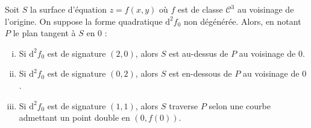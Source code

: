 
	\begin{application}
		Soit $S$ la surface d'équation $z = f(x, y)$ où $f$ est de classe $\mathcal{C}^3$ au voisinage de l'origine. On suppose la forme quadratique $\mathrm{d}^2 f_0$ non dégénérée. Alors, en notant $P$ le plan tangent à $S$ en $0$ :
		\begin{enumerate}[(i)]
			\item Si $\mathrm{d}^2 f_0$ est de signature $(2, 0)$, alors $S$ est au-dessus de $P$ au voisinage de $0$.
			\item Si $\mathrm{d}^2 f_0$ est de signature $(0, 2)$, alors $S$ est en-dessous de $P$ au voisinage de $0$.
			\item Si $\mathrm{d}^2 f_0$ est de signature $(1, 1)$, alors $S$ traverse $P$ selon une courbe admettant un point double en $(0, f(0))$.
		\end{enumerate}
	\end{application}

